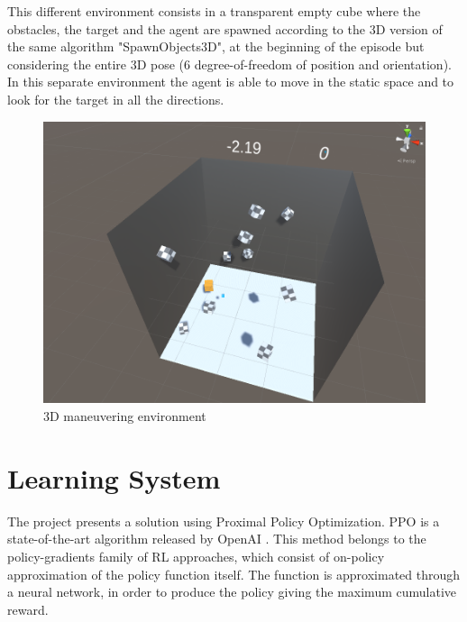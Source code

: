 \documentclass{ifacconf}
\begin{document}
This different environment consists in a transparent empty cube where the obstacles, the target and the agent are spawned according to the 3D version of the same algorithm "SpawnObjects3D", at the beginning of the episode but considering the entire 3D pose (6 degree-of-freedom of position and orientation). In this separate environment the agent is able to move in the static space and to look for the target in all the directions.\\

\begin{figure}[H]
\begin{center}
\includegraphics[width=\linewidth]{res/un_3denv.png} 
\caption{3D maneuvering environment} 
\label{fig:graphical_env}
\end{center}
\end{figure}

\section{Learning System} %
The project presents a solution using Proximal Policy Optimization. PPO is a state-of-the-art algorithm released by OpenAI \citep{ppo}. This method belongs to the policy-gradients family of RL approaches, which consist of on-policy approximation of the policy function itself. The function is approximated through a neural network, in order to produce the policy giving the maximum cumulative reward.
\end{document}
